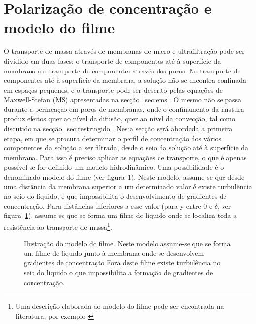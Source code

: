 \section{Polarização de concentração e modelo do filme} %
\label{sec:filmepol}
O transporte de massa através de membranas de micro e ultrafiltração pode ser dividido em duas fases: o transporte de componentes até à superfície da membrana e o transporte de componentes através dos poros. No transporte de componentes até à superfície da membrana, a solução não se encontra confinada em espaços pequenos, e o transporte pode ser descrito pelas equações de Maxwell-Stefan (MS) apresentadas na secção~\ref{sec:ems}. O mesmo não se passa durante a permeação em poros de membranas, onde o confinamento da mistura produz efeitos quer ao nível da difusão, quer ao nível da convecção, tal como discutido na secção~\ref{sec:restringido}. Nesta secção será abordada a primeira etapa, em que se procura determinar o perfil de concentração dos vários componentes da solução a ser filtrada, desde o seio da solução até à superfície da membrana. Para isso é preciso aplicar as equações de transporte, o que é apenas possível se for definido um modelo hidrodinâmico. Uma possibilidade é o denominado modelo do filme (ver figura~\ref{fig:modfilme}). Neste modelo, assume-se que desde uma distância da membrana superior a um determinado valor $\delta$ existe turbulência no seio do líquido, o que impossibilita o desenvolvimento de gradientes de concentração. 
Para distâncias inferiores a esse valor (para y entre 0 e $\delta$, ver figura~\ref{fig:modfilme}), assume-se que se forma um filme de líquido onde se localiza toda a resistência ao transporte de massa\footnote{Uma descrição elaborada do modelo do filme pode ser encontrada na literatura, por exemplo \cite{zydneyfilm,vasan}}.
\begin{figure}
\centering

\caption[Ilustração do modelo do filme]{Ilustração do modelo do filme. Neste modelo assume-se que se forma um filme de líquido junto à membrana onde se desenvolvem gradientes de concentração Fora deste filme existe turbulência no seio do líquido o que impossibilita a formação de gradientes de concentração.}
\label{fig:modfilme}
\end{figure}

